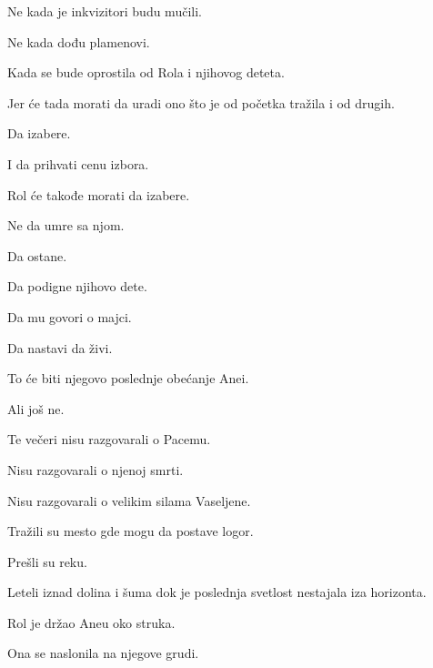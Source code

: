 Ne kada je inkvizitori budu mučili.

Ne kada dođu plamenovi.

\bigskip

Kada se bude oprostila od Rola i njihovog deteta.

\bigskip

Jer će tada morati da uradi ono što je od početka tražila i od drugih.

\bigskip

Da izabere.

\bigskip

I da prihvati cenu izbora.

\bigskip

Rol će takođe morati da izabere.

\bigskip

Ne da umre sa njom.

\bigskip

Da ostane.

\bigskip

Da podigne njihovo dete.

Da mu govori o majci.

\bigskip

Da nastavi da živi.

\bigskip

To će biti njegovo poslednje obećanje Anei.

\bigskip

Ali još ne.

\bigskip

Te večeri nisu razgovarali o Pacemu.

\bigskip

Nisu razgovarali o njenoj smrti.

\bigskip

Nisu razgovarali o velikim silama Vaseljene.

\bigskip

Tražili su mesto gde mogu da postave logor.

\bigskip

Prešli su reku.

\bigskip

Leteli iznad dolina i šuma dok je poslednja svetlost nestajala iza horizonta.

\bigskip

Rol je držao Aneu oko struka.

\bigskip

Ona se naslonila na njegove grudi.

\bigskip

